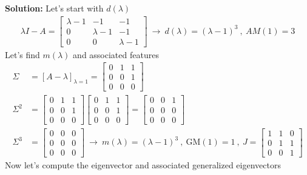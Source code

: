 \documentclass[twoside]{article}
\begin{document}
\textbf{Solution:} Let's start with  $d(\lambda)$
%
\begin{align*}
  \lambda I - A = \left[ \begin{array}{ccc} \lambda - 1 & -1 & -1 \\ 0 & \lambda - 1 & -1 \\ 0 & 0 & \lambda - 1 \end{array} \right] 
  \ \rightarrow \ d(\lambda) = (\lambda - 1)^3 \ , \ AM(1) = 3
\end{align*}
% 
Let's find $m(\lambda)$ and associated features
%
%
\begin{align*}
  \Sigma &= \left[ A - \lambda \right]_{\lambda = 1} = \left[ \begin{array}{ccc} 0 & 1 & 1 \\ 0 & 0 & 1 \\ 0 & 0 & 0 \end{array} \right] 
  \\
  \Sigma^2 &= \left[ \begin{array}{ccc} 0 & 1 & 1 \\ 0 & 0 & 1 \\ 0 & 0 & 0 \end{array} \right]  \left[ \begin{array}{ccc} 0 & 1 & 1 \\ 0 & 0 & 1 \\ 0 & 0 & 0 \end{array} \right] = \left[ \begin{array}{ccc} 0 & 0 & 1 \\ 0 & 0 & 0 \\ 0 & 0 & 0 \end{array} \right]
  \\
  \Sigma^3 &= \left[ \begin{array}{ccc} 0 & 0 & 0 \\ 0 & 0 & 0 \\ 0 & 0 & 0 \end{array} \right] \ \rightarrow \ m(\lambda) = (\lambda - 1)^3 \ , \ 
  \mathrm{GM}(1) = 1 \ , \ J = \left[ \begin{array}{ccc} 1 & 1 & 0 \\ 0 & 1 & 1 \\ 0 & 0 & 1 \end{array} \right] 
\end{align*}
% 
Now let's compute the eigenvector and associated generalized eigenvectors
%
\end{document}
